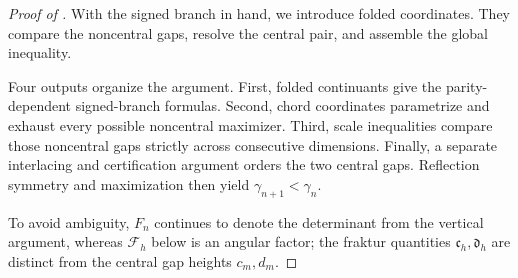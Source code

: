 \documentclass[12pt,anonymous]{iopjournal}
\numberwithin{equation}{section}
\theoremstyle{remark}
\begin{document}
\begin{proof}[Proof of ]
With the signed branch in hand, we introduce folded coordinates.  They
compare the noncentral gaps, resolve the central pair, and assemble the
global inequality.

Four outputs organize the argument.  First, folded continuants give the
parity-dependent signed-branch formulas.  Second, chord coordinates
parametrize and exhaust every possible noncentral maximizer.  Third, scale
inequalities compare those noncentral gaps strictly across consecutive
dimensions.  Finally, a separate interlacing and certification argument
orders the two central gaps.  Reflection symmetry and maximization then
yield \(\gamma_{n+1}<\gamma_n\).

To avoid ambiguity, \(F_n\) continues to denote the determinant from the
vertical argument, whereas \(\mathcal F_h\) below is an angular factor; the
fraktur quantities \(\mathfrak c_h,\mathfrak d_h\) are distinct from the
central gap heights \(c_m,d_m\).


\end{proof}
\end{document}

